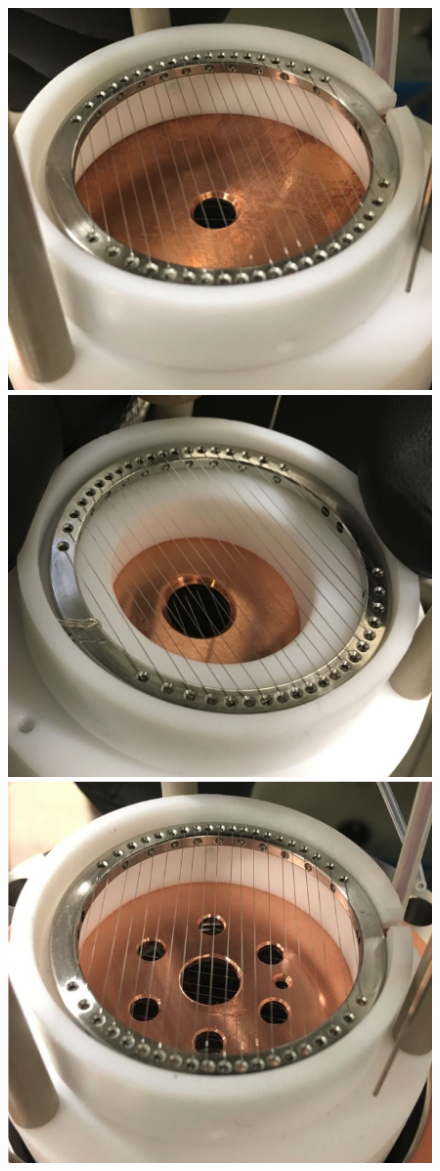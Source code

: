\begin{figure}[htbp]
\begin{center}
\includegraphics[width=\halffig]{figures/etrains/mask1.png}
\includegraphics[width=\halffig]{figures/etrains/mask2.png}
\\
\includegraphics[width=\halffig]{figures/etrains/mask3.png}

\end{center}
\end{figure}
